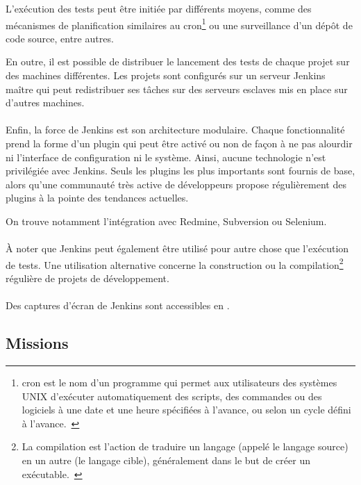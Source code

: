 L'exécution des tests peut être initiée par différents moyens, comme des mécanismes de planification similaires au cron\footnote{cron est le nom d'un programme qui permet aux utilisateurs des systèmes UNIX d'exécuter automatiquement des scripts, des commandes ou des logiciels à une date et une heure spécifiées à l'avance, ou selon un cycle défini à l'avance.~\cite{cron}} ou une surveillance d'un dépôt de code source, entre autres.

En outre, il est possible de distribuer le lancement des tests de chaque projet sur des machines différentes.
Les projets sont configurés sur un serveur Jenkins maître qui peut redistribuer ses tâches sur des serveurs esclaves mis en place sur d'autres machines.

\paragraph{}
Enfin, la force de Jenkins est son architecture modulaire.
Chaque fonctionnalité prend la forme d'un plugin qui peut être activé ou non de façon à ne pas alourdir ni l'interface de configuration ni le système.
Ainsi, aucune technologie n'est privilégiée avec Jenkins.
Seuls les plugins les plus importants sont fournis de base, alors qu'une communauté très active de développeurs propose régulièrement des plugins à la pointe des tendances actuelles.

On trouve notamment l'intégration avec Redmine, Subversion ou Selenium. 

\paragraph{}
À noter que Jenkins peut également être utilisé pour autre chose que l'exécution de tests.
Une utilisation alternative concerne la construction ou la compilation\footnote{La compilation est l'action de traduire un langage (appelé le langage source) en un autre (le langage cible), généralement dans le but de créer un exécutable.~\cite{compilation}} régulière de projets de développement.

\paragraph{}
Des captures d'écran de Jenkins sont accessibles en .



\subsection{Missions}

